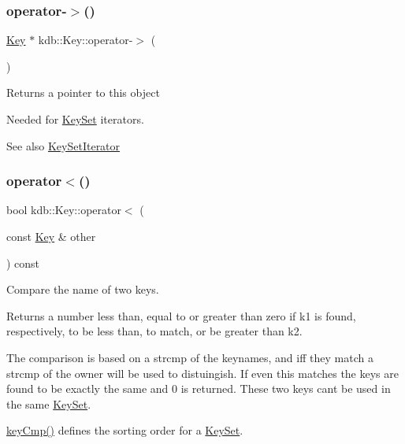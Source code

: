 \subsubsection{\texorpdfstring{operator-\/$>$()}{operator->()}}
{\footnotesize\ttfamily \hyperlink{classkdb_1_1Key}{Key} $\ast$ kdb\+::\+Key\+::operator-\/$>$ (\begin{DoxyParamCaption}{ }\end{DoxyParamCaption})\hspace{0.3cm}{\ttfamily [inline]}}

\begin{DoxyReturn}{Returns}
a pointer to this object
\end{DoxyReturn}
Needed for \hyperlink{classkdb_1_1KeySet}{Key\+Set} iterators. \begin{DoxySeeAlso}{See also}
\hyperlink{classkdb_1_1KeySetIterator}{Key\+Set\+Iterator} 
\end{DoxySeeAlso}
\mbox{\label{classkdb_1_1Key_aae9d359b54dc0df7d7b3ab3755a09732}} 
\subsubsection{\texorpdfstring{operator$<$()}{operator<()}}
{\footnotesize\ttfamily bool kdb\+::\+Key\+::operator$<$ (\begin{DoxyParamCaption}\item[{const \hyperlink{classkdb_1_1Key}{Key} \&}]{other }\end{DoxyParamCaption}) const\hspace{0.3cm}{\ttfamily [inline]}}



Compare the name of two keys. 

\begin{DoxyReturn}{Returns}
a number less than, equal to or greater than zero if k1 is found, respectively, to be less than, to match, or be greater than k2.
\end{DoxyReturn}
The comparison is based on a strcmp of the keynames, and iff they match a strcmp of the owner will be used to distuingish. If even this matches the keys are found to be exactly the same and 0 is returned. These two keys can\textquotesingle{}t be used in the same \hyperlink{classkdb_1_1KeySet}{Key\+Set}.

\hyperlink{group__keytest_gaf6e66e12fe04d535a5d1c8218ced803e}{key\+Cmp()} defines the sorting order for a \hyperlink{classkdb_1_1KeySet}{Key\+Set}.

